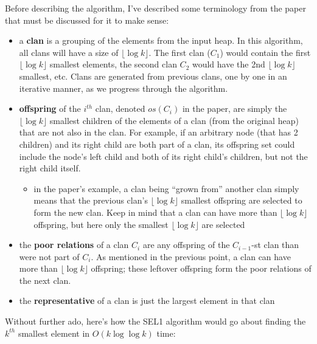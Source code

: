 \documentclass[12pt]{article}
\begin{document}
\begin{enumerate}
    Before describing the algorithm, I've described some terminology from the paper that must be discussed for it to make sense:

    \begin{itemize}
        \item a \textbf{clan} is a grouping of the elements from the input heap. In this algorithm, all clans will have a 
        size of $\lfloor \log k \rfloor$. The first clan ($C_1$) would contain the first $\lfloor \log k \rfloor$ smallest 
        elements, the second clan $C_2$ would have the 2nd $\lfloor \log k \rfloor$ smallest, etc. Clans are generated 
        from previous clans, one by one in an iterative manner, as we progress through the algorithm.
        
        \item \textbf{offspring} of the $i^{th}$ clan, denoted $os(C_i)$ in the paper, are simply the $\lfloor \log k \rfloor$ smallest 
        children of the elements of a clan (from the original heap) that are not also in the clan. For example, if an arbitrary 
        node (that has 2 children) and its right child are both part of a clan, its offspring set could include the node's left 
        child and both of its right child's children, but not the right child itself.

        \begin{itemize}
            \item in the paper's example, a clan being ``grown from'' another clan simply means that the previous clan's 
            $\lfloor \log k \rfloor$ smallest offspring are selected to form the new clan. Keep in mind that a clan can have 
            more than $\lfloor \log k \rfloor$ offspring, but here only the smallest $\lfloor \log k \rfloor$ are selected
        \end{itemize}

        \item the \textbf{poor relations} of a clan $C_i$ are any offspring of the $C_{i - 1}$-st clan than were not part 
        of $C_i$. As mentioned in the previous point, a clan can have more than $\lfloor \log k \rfloor$ offspring; these 
        leftover offspring form the poor relations of the next clan.

        \item the \textbf{representative} of a clan is just the largest element in that clan
    \end{itemize}

    Without further ado, here's how the SEL1 algorithm would go about finding the $k^{th}$ smallest element in 
    $O(k\log \log k)$ time:
    

\end{enumerate}
\end{document}

